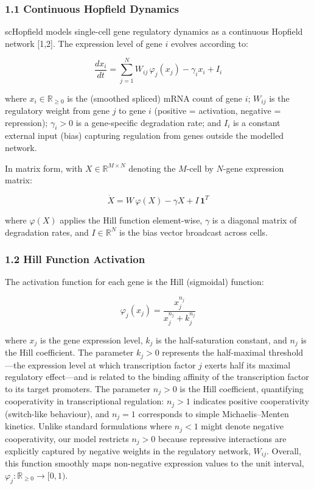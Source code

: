 \documentclass[11pt]{article}
\begin{document}
\subsubsection*{1.1 Continuous Hopfield Dynamics}

scHopfield models single-cell gene regulatory dynamics as a continuous Hopfield network [1,2]. The expression level of gene $i$ evolves according to:


\begin{equation}
\frac{dx_i}{dt} = \sum_{j=1}^{N} W_{ij}\,\varphi_j(x_j) - \gamma_i x_i + I_i 
\end{equation}


where $x_i \in \mathbb{R}_{\geq 0}$ is the (smoothed spliced) mRNA count of gene $i$; $W_{ij}$ is the regulatory weight from gene $j$ to gene $i$ (positive = activation, negative = repression); $\gamma_i > 0$ is a gene-specific degradation rate; and $I_i$ is a constant external input (bias) capturing regulation from genes outside the modelled network.

In matrix form, with $X \in \mathbb{R}^{M \times N}$ denoting the $M$-cell by $N$-gene expression matrix:


\begin{equation}
\dot{X} = W\,\varphi(X) - \gamma X + I\,\mathbf{1}^T 
\end{equation}


where $\varphi(X)$ applies the Hill function element-wise, $\gamma$ is a diagonal matrix of degradation rates, and $I \in \mathbb{R}^N$ is the bias vector broadcast across cells.


\subsubsection*{1.2 Hill Function Activation}

The activation function for each gene is the Hill (sigmoidal) function:


\begin{equation}
\varphi_j(x_j) = \frac{x_j^{n_j}}{x_j^{n_j} + k_j^{n_j}} 
\end{equation}


where $x_j$ is the gene expression level, $k_j$ is the half-saturation constant, and $n_j$ is the Hill coefficient. The parameter $k_j > 0$ represents the half-maximal threshold—the expression level at which transcription factor $j$ exerts half its maximal regulatory effect—and is related to the binding affinity of the transcription factor to its target promoters. The parameter $n_j > 0$ is the Hill coefficient, quantifying cooperativity in transcriptional regulation: $n_j > 1$ indicates positive cooperativity (switch-like behaviour), and $n_j = 1$ corresponds to simple Michaelis--Menten kinetics. Unlike standard formulations where $n_j < 1$ might denote negative cooperativity, our model restricts $n_j > 0$ because repressive interactions are explicitly captured by negative weights in the regulatory network, $W_{ij}$. Overall, this function smoothly maps non-negative expression values to the unit interval, $\varphi_j: \mathbb{R}_{\geq 0} \to [0,1)$.
\end{document}
